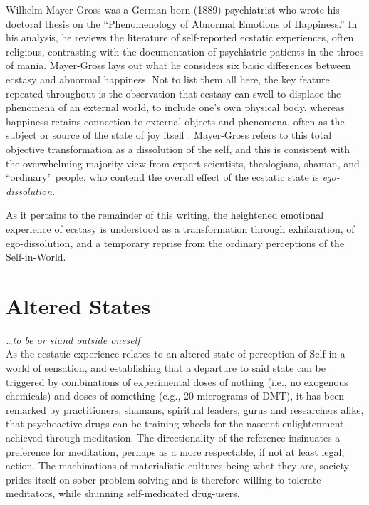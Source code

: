 \documentclass{UIdahoMastersThesis}
\begin{document}
Wilhelm Mayer-Gross was a German-born (1889) psychiatrist who wrote his doctoral thesis on the ``Phenomenology of Abnormal Emotions of Happiness.'' \cite{mayer-gross_translation:_nodate} In his analysis, he reviews the literature of self-reported ecstatic experiences, often religious, contrasting with the documentation of psychiatric patients in the throes of mania.  Mayer-Gross lays out what he considers six basic differences between ecstasy and abnormal happiness. Not to list them all here, the key feature repeated throughout is the observation that ecstasy can swell to displace the phenomena of an external world, to include one's own physical body, whereas happiness retains connection to external objects and phenomena, often as the subject or source of the state of joy itself \cite{beer_nature_2000} . Mayer-Gross refers to this total objective transformation as a dissolution of the self, and this is consistent with the overwhelming majority view from expert scientists, theologians, shaman, and ``ordinary'' people, who contend the overall effect of the ecstatic state is \emph{ego-dissolution}.

As it pertains to the remainder of this writing, the heightened emotional experience of ecstasy is understood as a transformation through exhilaration, of ego-dissolution, and a temporary reprise from the ordinary perceptions of the Self-in-World.

\section{Altered States}

\emph{\ldots to be or stand outside oneself}
\\

As the ecstatic experience relates to an altered state of perception of Self in a world of sensation, and establishing that a departure to said state can be triggered by combinations of experimental doses of nothing (i.e., no exogenous chemicals) and doses of something (e.g., 20 micrograms of DMT), it has been remarked by practitioners, shamans, spiritual leaders, gurus and researchers alike, that psychoactive drugs can be training wheels for the nascent enlightenment achieved through meditation. The directionality of the reference insinuates a preference for meditation, perhaps as a more respectable, if not at least legal, action. The machinations of materialistic cultures being what they are, society prides itself on sober problem solving and is therefore willing to tolerate meditators, while shunning self-medicated drug-users.
\end{document}
